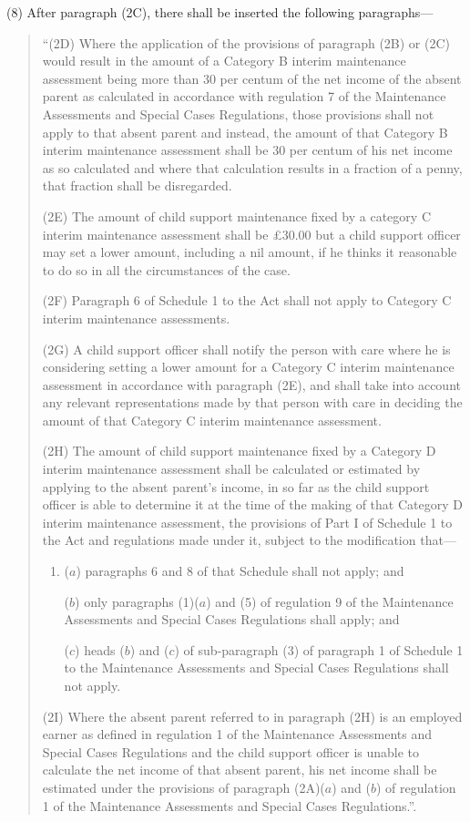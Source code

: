 \documentclass[12pt,a4paper]{article}
\begin{document}
(8) After paragraph (2C), there shall be inserted the following paragraphs—
\begin{quotation}
“(2D) Where the application of the provisions of paragraph (2B) or (2C) would result in the amount of a Category B interim maintenance assessment being more than 30 per centum of the net income of the absent parent as calculated in accordance with regulation 7 of the Maintenance Assessments and Special Cases Regulations, those provisions shall not apply to that absent parent and instead, the amount of that Category B interim maintenance assessment shall be 30 per centum of his net income as so calculated and where that calculation results in a fraction of a penny, that fraction shall be disregarded.

(2E) The amount of child support maintenance fixed by a category C interim maintenance assessment shall be £30.00 but a child support officer may set a lower amount, including a nil amount, if he thinks it reasonable to do so in all the circumstances of the case.

(2F) Paragraph 6 of Schedule 1 to the Act shall not apply to Category C interim maintenance assessments.

(2G) A child support officer shall notify the person with care where he is considering setting a lower amount for a Category C interim maintenance assessment in accordance with paragraph (2E), and shall take into account any relevant representations made by that person with care in deciding the amount of that Category C interim maintenance assessment.

(2H) The amount of child support maintenance fixed by a Category D interim maintenance assessment shall be calculated or estimated by applying to the absent parent’s income, in so far as the child support officer is able to determine it at the time of the making of that Category D interim maintenance assessment, the provisions of Part I of Schedule 1 to the Act and regulations made under it, subject to the modification that—
\begin{enumerate}\item[]
($a$) paragraphs 6 and 8 of that Schedule shall not apply; and

($b$) only paragraphs (1)($a$) and (5) of regulation 9 of the Maintenance Assessments and Special Cases Regulations shall apply; and

($c$) heads ($b$) and ($c$) of sub-paragraph (3) of paragraph 1 of Schedule 1 to the Maintenance Assessments and Special Cases Regulations shall not apply.
\end{enumerate}

(2I) Where the absent parent referred to in paragraph (2H) is an employed earner as defined in regulation 1 of the Maintenance Assessments and Special Cases Regulations and the child support officer is unable to calculate the net income of that absent parent, his net income shall be estimated under the provisions of paragraph (2A)($a$) and ($b$) of regulation 1 of the Maintenance Assessments and Special Cases Regulations.”.
\end{quotation}
\end{document}
